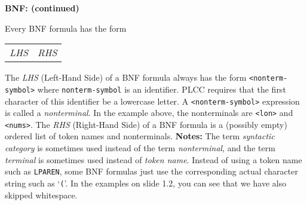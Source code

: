 \begin{minipage}[t]{\sw}
\slidenumber
\LARGE
{\bf BNF: (continued)}\exx
\emm{\Large\LightBox{\MYlon}}\exx

Every BNF formula has the form

\vspace{1ex}
\emm%
\begin{tabular}{@{}l@{\tt ~::=~}l}
{\em LHS} & {\em RHS} \\
\end{tabular}

\vspace{1ex}
The {\em LHS} (Left-Hand Side) of a BNF formula always has the form
\verb'<nonterm-symbol>' where \verb'nonterm-symbol' is an identifier.
PLCC requires that the first character
of this identifier be a lowercase letter.
A \verb'<nonterm-symbol>' expression is called a {\em nonterminal}.
In the example above,
the nonterminals are \verb'<lon>' and \verb'<nums>'.\exx
The {\em RHS} (Right-Hand Side) of a BNF formula
is a (possibly empty) ordered list
of token names and nonterminals.\exx
{\bf Notes:} The term {\em syntactic category} is sometimes used instead
of the term {\em nonterminal},
and the term {\em terminal} is sometimes used instead of {\em token name}.
Instead of using a token name such as \verb'LPAREN',
some BNF formulas just use
the corresponding actual character string such as `\verb'(''.
In the examples on slide 1.2,
you can see that we have also skipped whitespace.
\end{minipage}
\clearpage
